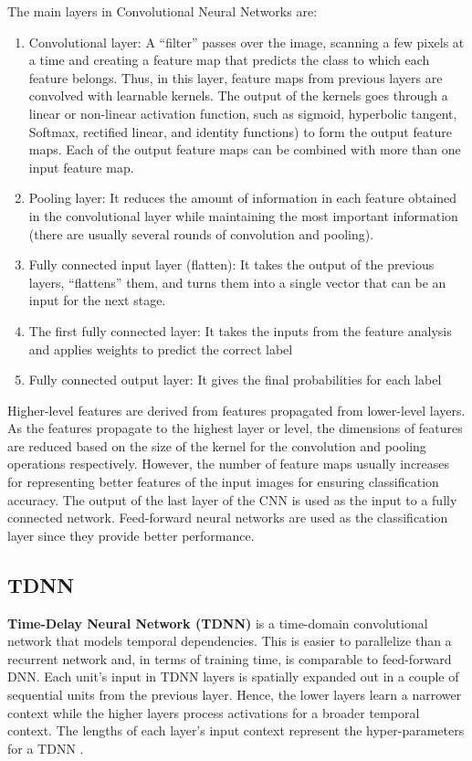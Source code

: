 The main layers in Convolutional Neural Networks are:
\begin{enumerate}
    \item Convolutional layer: A “filter” passes over the image, scanning a few pixels at a time and creating a feature map that predicts the class to which each feature belongs. Thus, in this layer, feature maps from previous layers are convolved with learnable kernels. The output of the kernels goes through a linear or non-linear activation function, such as sigmoid, hyperbolic tangent, Softmax, rectified linear, and identity functions) to form the output feature maps. Each of the output feature maps can be combined with more than one input feature map.
    \item Pooling layer: It reduces the amount of information in each feature obtained in the convolutional layer while maintaining the most important information (there are usually several rounds of convolution and pooling).
    \item Fully connected input layer (flatten): It takes the output of the previous layers, “flattens” them, and turns them into a single vector that can be an input for the next stage.
    \item The first fully connected layer: It takes the inputs from the feature analysis and applies weights to predict the correct label
    \item Fully connected output layer: It gives the final probabilities for each label
\end{enumerate}

Higher-level features are derived from features propagated from lower-level layers. As the features propagate to the highest layer or level, the dimensions of features are reduced based on the size of the kernel for the convolution and pooling operations respectively. However, the number of feature maps usually increases for representing better features of the input images for ensuring classification accuracy. The output of the last layer of the CNN is used as the input to a fully connected network. Feed-forward neural networks are used as the classification layer since they provide better performance.

\subsection{TDNN}
\textbf{Time-Delay Neural Network (TDNN)} is a time-domain convolutional network that models temporal dependencies. This is easier to parallelize than a recurrent network and, in terms of training time, is comparable to feed-forward DNN. Each unit's input in TDNN layers is spatially expanded out in a couple of sequential units from the previous layer. Hence, the lower layers learn a narrower context while the higher layers process activations for a broader temporal context. The lengths of each layer's input context represent the hyper-parameters for a TDNN \cite{kreyssig_improved_2018}.

